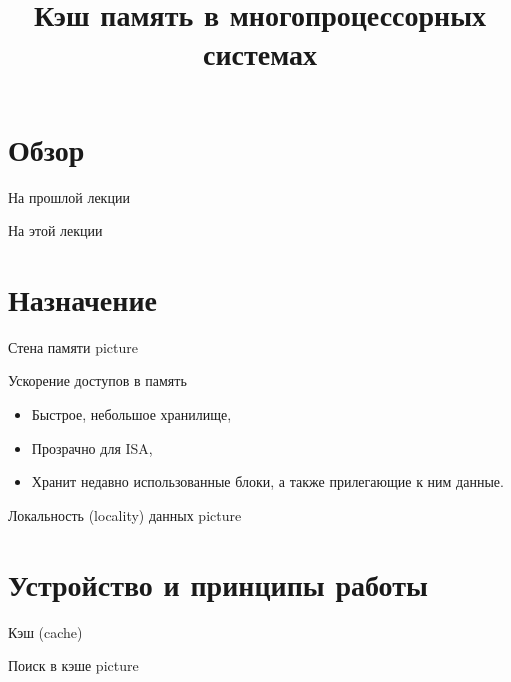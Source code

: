 

\title{Кэш память в многопроцессорных системах}



\begin{frame}
\titlepage
\end{frame}

\section*{Обзор}

\begin{frame}{На прошлой лекции}
\end{frame}

\begin{frame}{На этой лекции}
\tableofcontents
\end{frame}

\section{Назначение}

\begin{frame}{Стена памяти}
\todo picture
\end{frame}

\begin{frame}{Ускорение доступов в память}
\begin{itemize}
    \item Быстрое, небольшое хранилище,
    \item Прозрачно для ISA,
    \item Хранит недавно использованные блоки, а также прилегающие к ним данные.
\end{itemize}
\end{frame}

\begin{frame}{Локальность (\abbr locality) данных}
\todo picture
\end{frame}

\section{Устройство и принципы работы}

\begin{frame}{Кэш (\abbr cache)}
\end{frame}

\begin{frame}{Поиск в кэше}
\todo picture
\end{frame}

